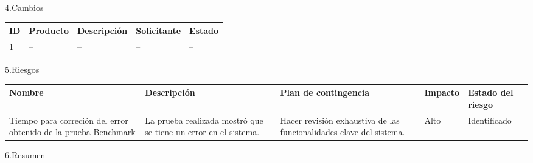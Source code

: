 \documentclass[12pt]{report}
\numberwithin{equation}{section}
\begin{document}
\begin{flushleft}
\large{4.Cambios}\\

\begin{table}[H]
\begin{tabular}{|m{0.5cm}|m{2cm}|m{4.5cm}|m{3.5cm}|m{3.5cm}|}
\hline 
\textbf{ID} & \textbf{Producto} & \textbf{Descripci\'on} & \textbf{Solicitante} & \textbf{Estado}  \\
\hline
\hline
1 & \small{--}  & \small{--} &\small{--} & \small{--}\\
\hline
\end{tabular}
\label{tabla: TABLA CE Cambios Seg}
\end{table}



\large{5.Riesgos}\\


\begin{table}[H]
\begin{tabular}{|m{2cm}|m{4cm}|m{4cm}|m{2cm}|m{2cm}|}
\hline 
\textbf{Nombre } & \textbf{Descripci\'on} & \textbf{Plan de contingencia} & \textbf{Impacto} & \textbf{Estado del riesgo}  \\
\hline
\hline
\small{Tiempo para correci\'on del error obtenido de la prueba Benchmark} &\small{La prueba realizada mostr\'o que se tiene un error en el sistema.} &\small{Hacer revisi\'on exhaustiva de las funcionalidades clave del sistema.}  &\small{Alto}    &Identificado  \\
\hline
\end{tabular}
\label{tabla: TABLA CE de nuevos riesgos Seg}
\end{table}

\large{6.Resumen}\\


\end{flushleft}
\end{document}
